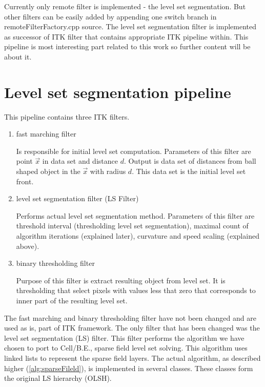 Currently only remote filter is implemented - the level set segmentation.
But other filters can be easily added by appending one switch branch in remoteFilterFactory.cpp source.
The level set segmentation filter is implemented as successor of ITK filter that contains appropriate ITK pipeline within.
This pipeline is most interesting part related to this work so further content will be about it.

\section{Level set segmentation pipeline}

This pipeline contains three ITK filters.
\begin{enumerate}
  \item{fast marching filter}
  \par
  Is responsible for initial level set computation.
Parameters of this filter are point $\vec{x}$ in data set and distance $d$.
Output is data set of distances from ball shaped object in the $\vec{x}$ with radius $d$.
This data set is the initial level set front.

  \item{level set segmentation filter (LS Filter)}
  \par
  Performs actual level set segmentation method.
Parameters of this filter are threshold interval (thresholding level set segmentation),  maximal count of algorithm iterations (explained later), curvature and speed scaling (explained above).

  \item{binary thresholding filter}
  \par
  Purpose of this filter is extract resulting object from level set.
It is thresholding that select pixels with values less that zero that corresponds to inner part of the resulting level set.
\end{enumerate}

The fast marching and binary thresholding filter have not been changed and are used as is, part of ITK framework.
The only filter that has been changed was the level set segmentation (LS) filter.
This filter performs the algorithm we have chosen to port to \mbox{Cell/B.E.}, sparse field level set solving.
This algorithm uses linked lists to represent the sparse field layers.
The actual algorithm, as described higher (\ref{alg:sparseFileld}), is implemented in several classes.
These classes form the original LS hierarchy (OLSH).

